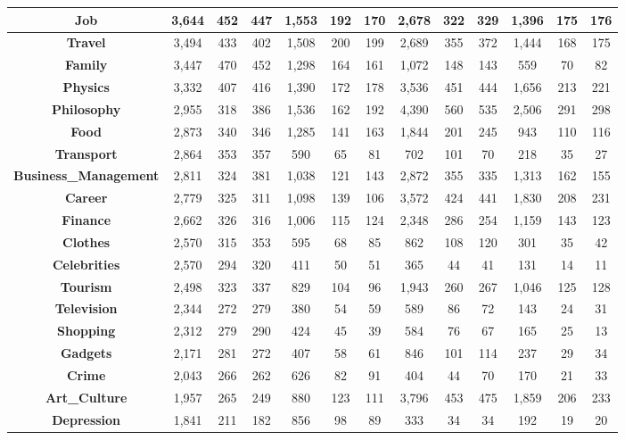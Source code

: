 \begin{table}[t]
{\begin{tabular}{|c||c|c|c||c|c|c||c|c|c||c|c|c|}
\textbf{Job} & 3,644 & 452 & 447 & 1,553 & 192 & 170 & 2,678 & 322 & 329 & 1,396 & 175 & 176\\ \hline
\textbf{Travel} & 3,494 & 433 & 402 & 1,508 & 200 & 199 & 2,689 & 355 & 372 & 1,444 & 168 & 175\\ \hline
\textbf{Family} & 3,447 & 470 & 452 & 1,298 & 164 & 161 & 1,072 & 148 & 143 & 559 & 70 & 82\\ \hline
\textbf{Physics} & 3,332 & 407 & 416 & 1,390 & 172 & 178 & 3,536 & 451 & 444 & 1,656 & 213 & 221\\ \hline
\textbf{Philosophy} & 2,955 & 318 & 386 & 1,536 & 162 & 192 & 4,390 & 560 & 535 & 2,506 & 291 & 298\\ \hline
\textbf{Food} & 2,873 & 340 & 346 & 1,285 & 141 & 163 & 1,844 & 201 & 245 & 943 & 110 & 116\\ \hline
\textbf{Transport} & 2,864 & 353 & 357 & 590 & 65 & 81 & 702 & 101 & 70 & 218 & 35 & 27\\ \hline
\textbf{Business\_Management} & 2,811 & 324 & 381 & 1,038 & 121 & 143 & 2,872 & 355 & 335 & 1,313 & 162 & 155\\ \hline
\textbf{Career} & 2,779 & 325 & 311 & 1,098 & 139 & 106 & 3,572 & 424 & 441 & 1,830 & 208 & 231\\ \hline
\textbf{Finance} & 2,662 & 326 & 316 & 1,006 & 115 & 124 & 2,348 & 286 & 254 & 1,159 & 143 & 123\\ \hline
\textbf{Clothes} & 2,570 & 315 & 353 & 595 & 68 & 85 & 862 & 108 & 120 & 301 & 35 & 42\\ \hline
\textbf{Celebrities} & 2,570 & 294 & 320 & 411 & 50 & 51 & 365 & 44 & 41 & 131 & 14 & 11\\ \hline
\textbf{Tourism} & 2,498 & 323 & 337 & 829 & 104 & 96 & 1,943 & 260 & 267 & 1,046 & 125 & 128\\ \hline
\textbf{Television} & 2,344 & 272 & 279 & 380 & 54 & 59 & 589 & 86 & 72 & 143 & 24 & 31\\ \hline
\textbf{Shopping} & 2,312 & 279 & 290 & 424 & 45 & 39 & 584 & 76 & 67 & 165 & 25 & 13\\ \hline
\textbf{Gadgets} & 2,171 & 281 & 272 & 407 & 58 & 61 & 846 & 101 & 114 & 237 & 29 & 34\\ \hline
\textbf{Crime} & 2,043 & 266 & 262 & 626 & 82 & 91 & 404 & 44 & 70 & 170 & 21 & 33\\ \hline
\textbf{Art\_Culture} & 1,957 & 265 & 249 & 880 & 123 & 111 & 3,796 & 453 & 475 & 1,859 & 206 & 233\\ \hline
\textbf{Depression} & 1,841 & 211 & 182 & 856 & 98 & 89 & 333 & 34 & 34 & 192 & 19 & 20\\ \hline

\end{tabular}}
\end{table}
